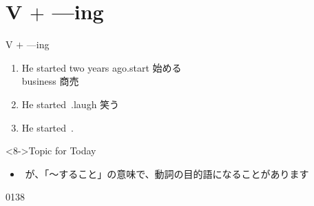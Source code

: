 \documentclass[aspectratio=169,xcolor={dvipsnames,table}]{beamer}
\begin{document}
\section{V $+$ ---ing}
\begin{frame}[plain]{V $+$ ---ing}
 \begin{enumerate}
  \item<1-> He started  two years ago.\hfill{\scriptsize start  始める}\\
\hspace{92pt}\hfill{\scriptsize business  商売}
  \item<3-> He started \,.\hfill{\scriptsize laugh  笑う}\hspace{10pt}
  \item<5-> He started \,.%
\hfill{}
 \end{enumerate}

\vspace{20pt}

\begin{block}<8->{Topic for Today}
\begin{itemize}[square]\small
 \item {}\,\,が、「〜すること」の意味で、動詞の目的語になることがあります
 \end{itemize}
     \end{block}

\hfill{\tiny 0138}\,{\scriptsize {}}

\end{frame}
\end{document}
